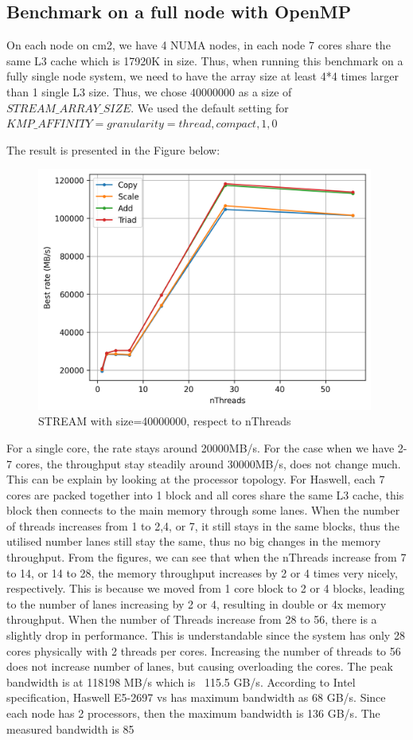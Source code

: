 \documentclass[article]{scrartcl}
\begin{document}
\subsection{Benchmark on a full node with OpenMP}
On each node on cm2, we have 4 NUMA nodes, in each node 7 cores share the same L3 cache which is 17920K in size. Thus, when running this benchmark on a fully single node system, we need to have the array size at least 4*4 times larger than 1 single L3 size. Thus, we chose $40000000$ as a size of $STREAM\_ARRAY\_SIZE$. 
We used the default setting for $KMP\_AFFINITY=granularity=thread,compact,1,0$

The result is presented in the Figure below:
\begin{figure}[htpb]
    \centering
    \includegraphics[width=\textwidth,height=8cm,keepaspectratio=true]{../figs/2.5_StreamScale.png}
    \caption{STREAM with size=40000000, respect to nThreads}
    \label{fig:stream2}
\end{figure}
For a single core, the rate stays around 20000MB/s. For the case when we have 2-7 cores, the throughput stay steadily around 30000MB/s, does not change much. This can be explain by looking at the processor topology. For Haswell, each 7 cores are packed together into 1 block and all cores share the same L3 cache, this block then connects to the main memory through some lanes. When the number of threads increases from 1 to 2,4, or 7, it still stays in the same blocks, thus the utilised number lanes still stay the same, thus no big changes in the memory throughput. From the figures, we can see that when the nThreads increase from 7 to 14, or 14 to 28, the memory throughput increases by 2 or 4 times very nicely, respectively. This is because we moved from 1 core block to 2 or 4 blocks, leading to the number of lanes increasing by 2 or 4, resulting in double or 4x memory throughput. When the number of Threads increase from 28 to 56, there is a slightly drop in performance. This is understandable since the system has only 28 cores physically with 2 threads per cores. Increasing the number of threads to 56 does not increase number of lanes, but causing overloading the cores.
The peak bandwidth is at 118198 MB/s which is ~115.5 GB/s. According to Intel specification, Haswell E5-2697 vs has maximum bandwidth as 68 GB/s. Since each node has 2 processors, then the maximum bandwidth is 136 GB/s. The measured bandwidth is 85%
\end{document}
